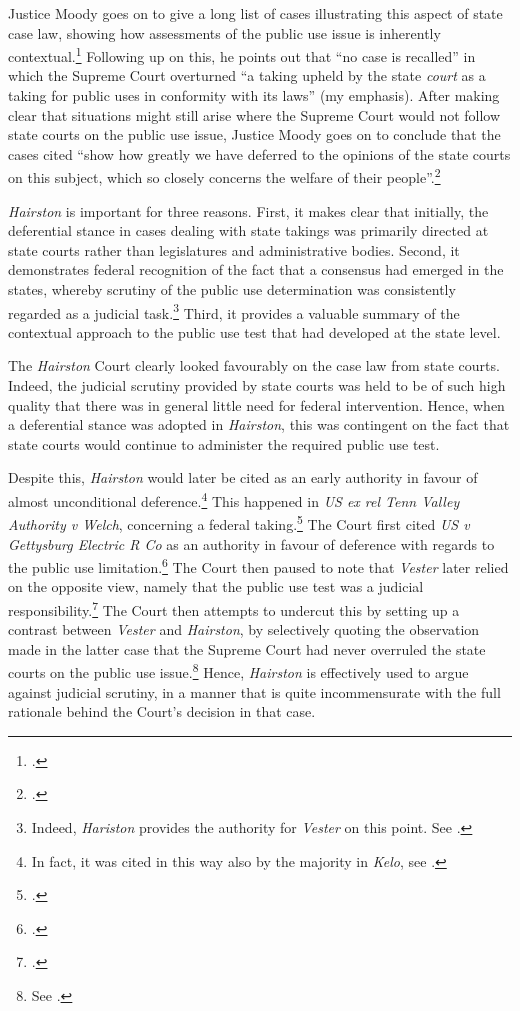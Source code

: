 Justice Moody goes on to give a long list of cases illustrating this aspect of state case law, showing how assessments of the public use issue is inherently contextual.\footcite[607]{hairston08} %
Following up on this, he points out that ``no case is recalled'' in which the Supreme Court overturned ``a taking upheld by the state {\it court} as a taking for public uses in conformity with its laws'' (my emphasis). After making clear that situations might still arise where the Supreme Court would not follow state courts on the public use issue, Justice Moody goes on to conclude that the cases cited ``show how greatly we have deferred to the opinions of the state courts on this subject, which so closely concerns the welfare of their people''.\footcite[606]{hairston08}

{\it Hairston} is important for three reasons. First, it makes clear that initially, the deferential stance in cases dealing with state takings was primarily directed at state courts rather than legislatures and administrative bodies. Second, it demonstrates federal recognition of the fact that a consensus had emerged in the states, whereby scrutiny of the public use determination was consistently regarded as a judicial task.\footnote{Indeed, {\it Hariston} provides the authority for {\it Vester} on this point. See \cite[606]{vester30}.} Third, it provides a valuable summary of the contextual approach to the public use test that had developed at the state level. 

The {\it Hairston} Court clearly looked favourably on the case law from state courts. Indeed, the judicial scrutiny provided by state courts was held to be of such high quality that there was in general little need for federal intervention. Hence, when a deferential stance was adopted in {\it Hairston}, this was contingent on the fact that state courts would continue to administer the required public use test.

Despite this, {\it Hairston} would later be cited as an early authority in favour of almost unconditional deference.\footnote{In fact, it was cited in this way also by the majority in {\it Kelo}, see \cite[482-483]{kelo05}.} This happened in {\it US ex rel Tenn Valley Authority v Welch}, concerning a federal taking.\footcite[552]{welch46} The Court first cited {\it US v Gettysburg Electric R Co} as an authority in favour of deference with regards to the public use limitation.\footcite{gettysburg96} The Court then paused to note that {\it Vester} later relied on the opposite view, namely that the public use test was a judicial responsibility.\footcite{vester30} The Court then attempts to undercut this by setting up a contrast between {\it Vester} and {\it Hairston}, by selectively quoting the observation made in the latter case that the Supreme Court had never overruled the state courts on the public use issue.\footnote{See \cite[552]{welch46}.} Hence, {\it Hairston} is effectively used to argue against judicial scrutiny, in a manner that is quite incommensurate with the full rationale behind the Court's decision in that case.

